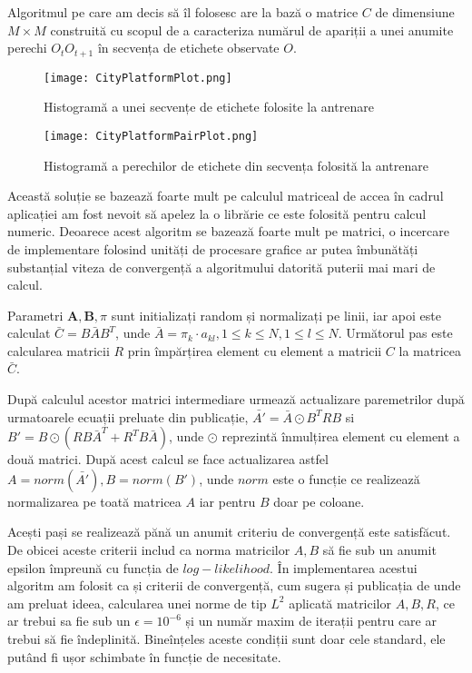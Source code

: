 Algoritmul pe care am decis să îl folosesc are la bază o matrice $C$ de dimensiune $M\times M$ construită cu scopul de a caracteriza numărul de apariții a unei anumite perechi $O_{t}O_{t+1}$ în secvența de etichete observate $O$.\par

\vspace{10mm}
\begin{figure}[H]
\centering
\texttt{[image: CityPlatformPlot.png]} \par
\caption{Histogramă a unei secvențe de etichete folosite la antrenare}
\end{figure}


\vspace{10mm}
\begin{figure}[H]
\centering
\texttt{[image: CityPlatformPairPlot.png]} \par
\caption{Histogramă a perechilor de etichete din secvența folosită la antrenare}
\end{figure}


Această soluție se bazează foarte mult pe calculul matriceal de accea în cadrul aplicației am fost nevoit să apelez la o librărie ce este folosită pentru calcul numeric. Deoarece acest algoritm se bazează foarte mult pe matrici, o incercare de implementare folosind unități de procesare grafice ar putea îmbunătăți substanțial viteza de convergență a algoritmului datorită puterii mai mari de calcul.\par

Parametri $\textbf{A},\textbf{B},\pi$ sunt initializați random și normalizați pe linii, iar apoi este calculat $\bar{C} = B\bar{A}B^{T}$, unde $\bar{A} = {\pi_{k}\cdot a_{kl}}, 1 \leq k \leq N, 1\leq l \leq N$. Următorul pas este calcularea matricii $R$ prin împărțirea element cu element a matricii $C$ la matricea $\bar{C}$.\par

După calculul acestor matrici intermediare urmează actualizare paremetrilor după urmatoarele ecuații preluate din publicație, $\bar{A'} = \bar{A} \odot B^{T}RB$  si $B' = B \odot(RB\bar{A}^{T} + R^{T}B\bar{A})$, unde $\odot$ reprezintă înmulțirea element cu element a două matrici. După acest calcul se face actualizarea astfel $A = norm(\bar{A'}),B = norm(B')$, unde $norm$ este o funcție ce realizează normalizarea pe toată matricea $A$ iar pentru $B$ doar pe coloane.\par

Acești pași se realizează pănă un anumit criteriu de convergență este satisfăcut. De obicei aceste criterii includ ca norma matricilor $A,B$ să fie sub un anumit epsilon împreună cu funcția de $log-likelihood$. În implementarea acestui algoritm am folosit ca și criterii de convergență, cum sugera și publicația de unde am preluat ideea, calcularea unei norme de tip $L^{2}$ aplicată matricilor $A,B,R$, ce ar trebui sa fie sub un $\epsilon = 10^{-6}$ și un număr maxim de iterații pentru care ar trebui să fie îndeplinită. Bineînțeles aceste condiții sunt doar cele standard, ele putând fi ușor schimbate în funcție de necesitate.\par

